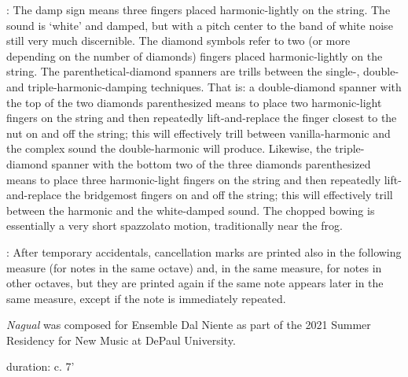 \documentclass[11pt]{article}
\newcommand*\circled[1]{\tikz[baseline=(char.base)]{
            \node[shape=circle,draw,inner sep=1pt] (char) {#1};}}
\begin{document}
\begin{center}
 : \circled{1} The damp sign means three fingers placed harmonic-lightly on the string. The sound is `white' and damped, but with a pitch center to the band of white noise still very much discernible. \circled{2} The diamond symbols refer to two (or more depending on the number of diamonds) fingers placed harmonic-lightly on the string. \circled{3} The parenthetical-diamond spanners are trills between the single-, double- and triple-harmonic-damping techniques. That is: a double-diamond spanner with the top of the two diamonds parenthesized means to place two harmonic-light fingers on the string and then repeatedly lift-and-replace the finger closest to the nut on and off the string; this will effectively trill between vanilla-harmonic and the complex sound the double-harmonic will produce. Likewise, the triple-diamond spanner with the bottom two of the three diamonds parenthesized means to place three harmonic-light fingers on the string and then repeatedly lift-and-replace the bridgemost fingers on and off the string; this will effectively trill between the harmonic and the white-damped sound. \circled{4} The chopped bowing is essentially a very short spazzolato motion, traditionally near the frog.
\rightskip\leftskip
\phantom{text} \hfill \phantom{()}

 : After temporary accidentals, cancellation marks are printed also in the following measure (for notes in the same octave) and, in the same measure, for notes in other octaves, but they are printed again if the same note appears later in the same measure, except if the note is immediately repeated.
\rightskip\leftskip
\phantom{text} \hfill \phantom{()}
\end{center}
\endgroup

\vspace*{9\baselineskip}

\begin{center}
\textit{Nagual} was composed for Ensemble Dal Niente as part of the 2021 Summer Residency for New Music at DePaul University.
\rightskip\leftskip
\phantom{text} \hfill \phantom{()}
\end{center}

\vspace*{26\baselineskip}

\begin{center}
duration: c. 7'
\end{center}
\end{document}

